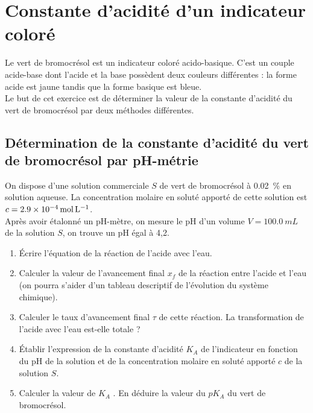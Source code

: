 \documentclass[a4paper,11pt,fleqn]{article}%
\begin{document}
		\section{Constante d'acidité d'un indicateur coloré}
		Le vert de bromocrésol est un indicateur coloré acido-basique. C'est un couple acide-base dont l'acide  et la base  possèdent deux couleurs différentes : la forme acide est jaune tandis que la forme basique est bleue.\\
		Le but de cet exercice est de déterminer la valeur de la constante d'acidité du vert de bromocrésol par deux méthodes différentes.
		\subsection{Détermination de la constante d'acidité du vert de bromocrésol par pH-métrie}
		On dispose d'une solution commerciale $S$ de vert de bromocrésol à \SI{0,02} {\percent} en solution aqueuse. La	concentration molaire en soluté apporté de cette solution est $c =\SI{ 2,9E-4}{\mole\per\liter}$.\\
		Après avoir étalonné un pH-mètre, on mesure le pH d'un volume $V=\SI{100,0}{mL}$ de la solution $S$, on
		trouve un pH égal à 4,2.
		\begin{enumerate}
			\item Écrire l'équation de la réaction de l'acide  avec l'eau.
			\item Calculer la valeur de l'avancement final $x_f$ de la réaction entre l'acide  et l'eau (on pourra s'aider d'un tableau descriptif de l'évolution du système chimique).
			\item Calculer le taux d'avancement final $\tau$ de cette réaction. La transformation de l'acide  avec l'eau est-elle totale ?
			\item Établir l'expression de la constante d'acidité $K_A$ de l'indicateur en fonction du pH de la solution et de la concentration molaire en soluté apporté $c$ de la solution $S$.
			\item Calculer la valeur de $K_A$ . En déduire la valeur du $pK_A$ du vert de bromocrésol.
		\end{enumerate}
		
\end{document}
